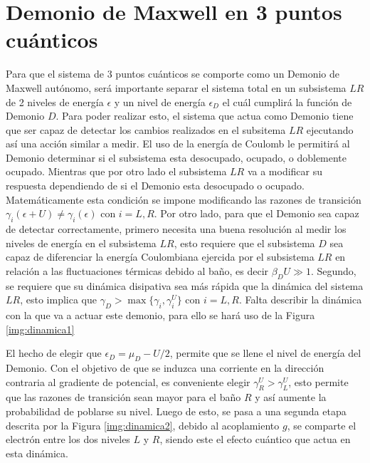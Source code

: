 \section{Demonio de Maxwell en 3 puntos cuánticos}
Para que el sistema de 3 puntos cuánticos se comporte como un Demonio de Maxwell autónomo, será importante separar el sistema total en un subsistema $LR$ de 2 niveles de energía $\epsilon$ y un nivel de energía $\epsilon_{D}$ el cuál cumplirá la función de Demonio $D$. Para poder realizar esto, el sistema que actua como Demonio tiene que ser capaz de detectar los cambios realizados en el subsitema $LR$ ejecutando así una acción similar a medir. El uso de la energía de Coulomb le permitirá al Demonio determinar si el subsistema esta desocupado, ocupado, o doblemente ocupado. Mientras que por otro lado el subsistema $LR$ va a modificar su respuesta dependiendo de si el Demonio esta desocupado o ocupado. Matemáticamente esta condición se impone modificando las razones de transición $\gamma_{i}(\epsilon + U)\neq \gamma_{i}(\epsilon)$ con $i=L,R$. Por otro lado, para que el Demonio sea capaz de detectar correctamente, primero necesita una buena resolución al medir los niveles de energía en el subsistema $LR$, esto requiere que el subsistema $D$ sea capaz de diferenciar la energía Coulombiana ejercida por el subsistema $LR$ en relación a las fluctuaciones térmicas debido al baño, es decir $\beta_{D}U \gg 1$. Segundo, se requiere que su dinámica disipativa sea más rápida que la dinámica del sistema $LR$, esto implica que $\gamma_{D}> \max\{\gamma_{i},\gamma^{U}_{i}\}$ con $i=L,R$. Falta describir la dinámica con la que va a actuar este demonio, para ello se hará uso de la Figura \ref{img:dinamica1}


El hecho de elegir que $\epsilon_{D} = \mu_{D} - U/2$, permite que se llene el nivel de energía del Demonio. Con el objetivo de que se induzca una corriente en la dirección contraria al gradiente de potencial, es conveniente elegir $\gamma^{U}_{R} > \gamma^{U}_{L}$, esto permite que las razones de transición sean mayor para el baño $R$ y así aumente la probabilidad de poblarse su  nivel. Luego de esto, se pasa a una segunda etapa descrita por la Figura \ref{img:dinamica2}, debido al acoplamiento $g$, se comparte el electrón entre los dos niveles $L$ y $R$, siendo este el efecto cuántico que actua en esta dinámica.  


